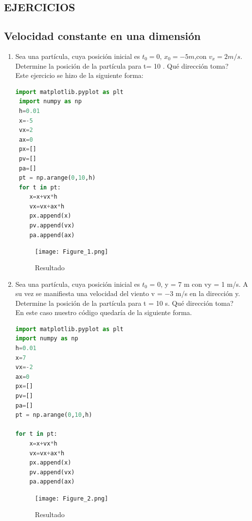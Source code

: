 \documentclass{article}
\begin{document}
\begin{flushleft}
  

\section{EJERCICIOS}

\subsection{Velocidad constante en una dimensión}
\begin{enumerate}
    \item Sea una partícula, cuya posición inicial es $t_0 = 0$, $x_0 = -5 m$,con $v_x =2 m/s$. Determine la posición de la partícula para t= 10 . Qué dirección toma?\\
    
    Este ejercicio se hizo de la siguiente forma:
     \begin{lstlisting}[language=Python,caption=Ejercicio 1]
 import matplotlib.pyplot as plt
 import numpy as np
 h=0.01
 x=-5
 vx=2
 ax=0
 px=[]
 pv=[]
 pa=[]
 pt = np.arange(0,10,h)
 for t in pt:
    x=x+vx*h
    vx=vx+ax*h
    px.append(x)
    pv.append(vx)
    pa.append(ax)

     \end{lstlisting}
    
    \begin{figure}[H]
    \centering
    \texttt{[image: Figure\_1.png]}
    \caption{Resultado}
    \end{figure}
        
        
    \item  Sea una partícula, cuya posición inicial es $t_0$ = 0, y = 7 m con vy = 1 m/s. A su vez se manifiesta una velocidad del viento v = −3 m/s en la dirección y. Determine la posición de la partícula para t = 10 s. Qué dirección toma? 
    \\
    En este caso nuestro código quedaría de la siguiente forma.
    \begin{lstlisting}[language=Python,caption=Ejercicio 2]
import matplotlib.pyplot as plt
import numpy as np
h=0.01
x=7
vx=-2
ax=0
px=[]
pv=[]
pa=[]
pt = np.arange(0,10,h)

for t in pt:
    x=x+vx*h
    vx=vx+ax*h
    px.append(x)
    pv.append(vx)
    pa.append(ax)
    \end{lstlisting}
    
    \begin{figure}[H]
    \texttt{[image: Figure\_2.png]}
    \caption{Resultado}
    \end{figure}
    

\end{enumerate}
\end{flushleft}
\end{document}
